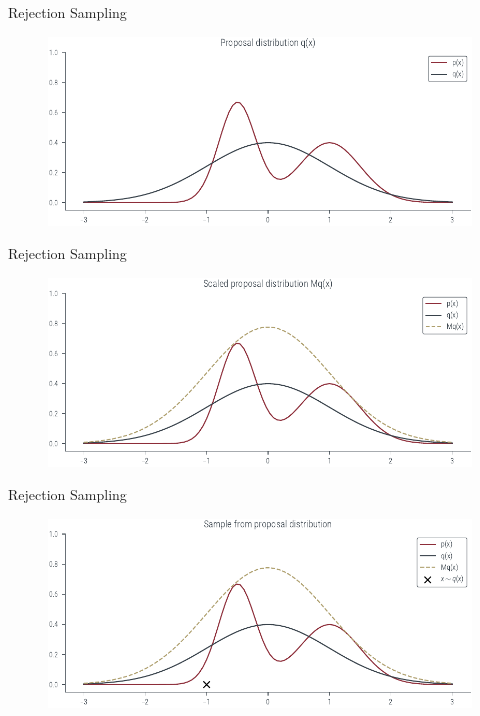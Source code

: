 \documentclass{beamer}
\begin{document}
    \begin{frame}{Rejection Sampling}
        \begin{figure}
            \centering
            \includegraphics[scale = 0.75]{../figures/sampling/rejection-sampling--1.0-True-False-False-False-False-False-False-False.pdf}
        \end{figure}
    \end{frame}

    \begin{frame}{Rejection Sampling}
        \begin{figure}
            \centering
            \includegraphics[scale = 0.75]{../figures/sampling/rejection-sampling--1.0-True-True-False-False-False-False-False-False.pdf}
        \end{figure}
    \end{frame}

    \begin{frame}{Rejection Sampling}
        \begin{figure}
            \centering
            \includegraphics[scale = 0.75]{../figures/sampling/rejection-sampling--1.0-True-True-True-False-False-False-False-False.pdf}
        \end{figure}
    \end{frame}
\end{document}
